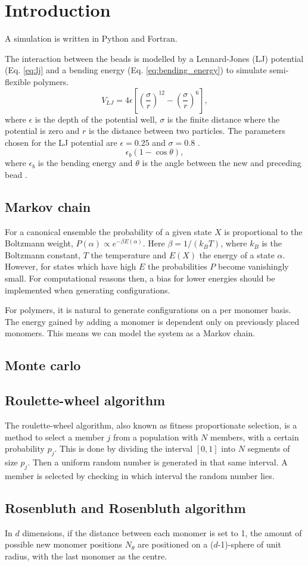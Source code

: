 \section{Introduction}
A simulation is written in Python and Fortran. 

The interaction between the beads is modelled by a Lennard-Jones (LJ) potential (Eq. \ref{eq:lj} and a bending energy (Eq. \ref{eq:bending_energy}) to simulate semi-flexible polymers.
\begin{equation}\label{eq:lj}
    V_{LJ} = 4\epsilon \left[ \left(\frac{\sigma}{r}\right)^{12} - \left(\frac{\sigma}{r}\right)^{6} \right],
\end{equation} where $\epsilon$ is the depth of the potential well, $\sigma$ is the finite distance where the potential is zero and $r$ is the distance between two particles. The parameters chosen for the LJ potential are $\epsilon=0.25$ and $\sigma=0.8$ \cite{jmt}.
\begin{equation}\label{eq:bending_energy}
    \epsilon_b(1-\cos{\theta}),
\end{equation} where $\epsilon_b$ is the bending energy and $\theta$ is the angle between the new and preceding bead \cite{hsu2011review}.

\subsection{Markov chain}
For a canonical ensemble the probability of a given state $X$ is proportional to the Boltzmann weight, $P(\alpha) \propto e^{-\beta E(\alpha)}$. Here $\beta=1/\left(k_B T\right)$, where $k_B$ is the Boltzmann constant, $T$ the temperature and $E(X)$ the energy of a state $\alpha$. However, for states which have high $E$ the probabilities $P$ become vanishingly small. For computational reasons then, a bias for lower energies should be implemented when generating configurations.

For polymers, it is natural to generate configurations on a per monomer basis. The energy gained by adding a monomer is dependent only on previously placed monomers. This means we can model the system as a Markov chain.

\subsection{Monte carlo}

\subsection{Roulette-wheel algorithm}
The roulette-wheel algorithm, also known as fitness proportionate selection, is a method to select a member $j$ from a population with $N$ members, with a certain probability $p_j$. This is done by dividing the interval $[0,1]$ into $N$ segments of size $p_j$. Then a uniform random number is generated in that same interval. A member is selected by checking in which interval the random number lies.


\subsection{Rosenbluth and Rosenbluth algorithm}
In $d$ dimensions, if the distance between each monomer is set to 1, the amount of possible new monomer positions $N_{\theta}$ are positioned on a ($d$-1)-sphere of unit radius, with the last monomer as the centre.